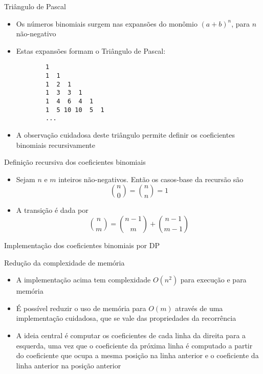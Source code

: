 \begin{frame}[fragile]{Triângulo de Pascal}

    \begin{itemize}
        \item Os números binomiais surgem nas expansões do monômio $(a + b)^n$, para $n$ não-negativo

        \item Estas expansões formam o Triângulo de Pascal:

\begin{verbatim}
        1
        1  1
        1  2  1
        1  3  3  1
        1  4  6  4  1
        1  5 10 10  5  1
        ...
\end{verbatim}
        \item A observação cuidadosa deste triângulo permite definir os coeficientes binomiais recursivamente
    \end{itemize}

\end{frame}

\begin{frame}[fragile]{Definição recursiva dos coeficientes binomiais}

    \begin{itemize}
        \item Sejam $n$ e $m$ inteiros não-negativos. Então os casos-base da recursão são
$$
        \binom{n}{0} = \binom{n}{n} = 1
$$
        \item A transição é dada por
$$
        \binom{n}{m} = \binom{n - 1}{m} + \binom{n - 1}{m - 1}
$$
    \end{itemize}

\end{frame}

\begin{frame}[fragile]{Implementação dos coeficientes binomiais por DP}
\end{frame}

\begin{frame}[fragile]{Redução da complexidade de memória}

    \begin{itemize}
        \item A implementação acima tem complexidade $O(n^2)$ para execução e para memória

        \item É possível reduzir o uso de memória para $O(m)$ através de uma implementação
            cuidadosa, que se vale das propriedades da recorrência

        \item A ideia central é computar os coeficientes de cada linha da direita para a esquerda,
            uma vez que o coeficiente da próxima linha é computado a partir do coeficiente que
            ocupa a mesma posição na linha anterior e o coeficiente da linha anterior na posição
            anterior
    \end{itemize}

\end{frame}

